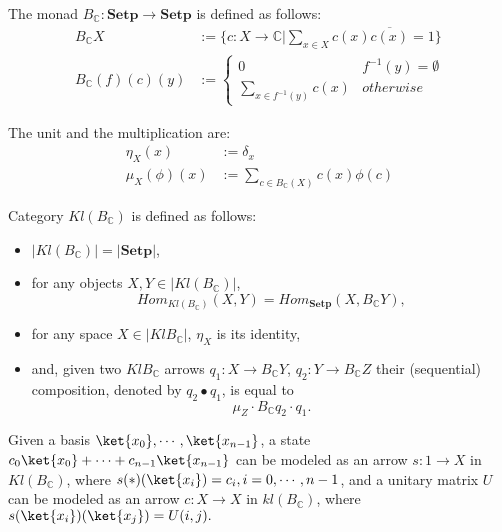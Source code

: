 \documentclass{llncs}
\newcommand{\C}{\mathbb{C}}
\newcommand{\BC}{B_{\mathbb{C}}}
\begin{document}
\begin{definition}
The monad $\BC:\mathbf{Setp}\rightarrow \mathbf{Setp}$ is defined as follows:
$$
\begin{aligned}
\BC X&:=\{c:X\rightarrow \C|\sum_{x\in X}c(x)\overline{c(x)}=1\}\\
\BC(f)(c)(y)&:=\begin{cases}0 &f^{-1}(y)=\emptyset\\
\sum_{x\in f^{-1}(y)}c(x) &otherwise
\end{cases}
\end{aligned}
$$

\end{definition}
The unit and the multiplication are:
$$
\begin{aligned}
\eta_{X}(x)&:=\delta_{x}\\
\mu_{X}(\phi)(x)&:=\sum_{c\in B_{\C}(X)}c(x)\phi(c)
\end{aligned}
$$

\begin{definition}
Category $Kl(\BC)$ is defined as follows:
\begin{itemize}
\item $|Kl(\BC)|=|\mathbf{Setp}|$,
\item for any objects $X,Y\in |Kl(B_{\C})|$,
$$Hom_{Kl(B_{\C})}(X,Y)=Hom_{\mathbf{Setp}}(X,\BC Y),$$
\item for any space $X\in |Kl\BC|$, $\eta_X$ is its identity,
\item and, given two $Kl\BC$ arrows $q_1:X\rightarrow \BC Y$, $q_2:Y\rightarrow \BC Z$ their (sequential) composition, denoted by $q_2\bullet q_1$, is equal to $$\mu_Z\cdot \BC q_2\cdot q_1.$$
\end{itemize}
\end{definition}

Given a basis $\ket{x_0},\cdots,\ket{x_{n-1}}$, a state $c_0\ket{x_0}+\cdots+c_{n-1}\ket{x_{n-1}}$ can be modeled as an arrow
$s:1\rightarrow X$ in $Kl(\BC)$, where $s(\ast)({\ket{x_i}})=c_i, i=0,\cdots,n-1$, and a unitary matrix $U$ can be modeled as an arrow $c:X\rightarrow X$ in $kl(\BC)$, where $s(\ket{x_i})(\ket{x_j})=U(i,j).$ 

\begin{example}

\end{example}





\end{document}
